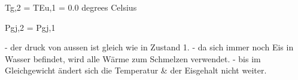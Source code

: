 Tg,2 = TEu,1 = 0.0 degrees Celsius

Pgj,2 = Pgj,1

- der druck von aussen ist gleich wie in Zustand 1.
- da sich immer noch Eis in Wasser befindet, wird alle Wärme zum Schmelzen verwendet.
- bis im Gleichgewicht ändert sich die Temperatur & der Eisgehalt nicht weiter.